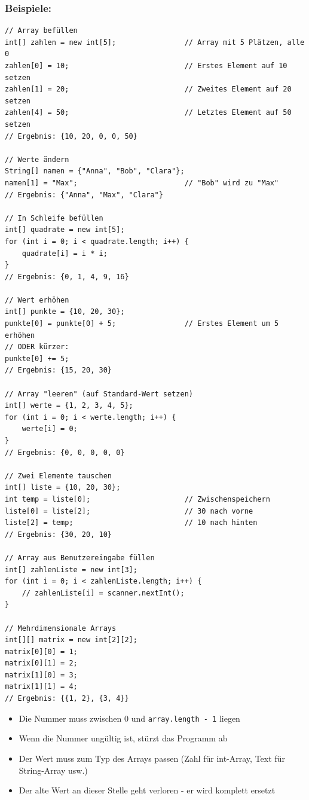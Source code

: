 \subsubsection*{Beispiele:}
\begin{lstlisting}
// Array befüllen
int[] zahlen = new int[5];                // Array mit 5 Plätzen, alle 0
zahlen[0] = 10;                           // Erstes Element auf 10 setzen
zahlen[1] = 20;                           // Zweites Element auf 20 setzen
zahlen[4] = 50;                           // Letztes Element auf 50 setzen
// Ergebnis: {10, 20, 0, 0, 50}

// Werte ändern
String[] namen = {"Anna", "Bob", "Clara"};
namen[1] = "Max";                         // "Bob" wird zu "Max"
// Ergebnis: {"Anna", "Max", "Clara"}

// In Schleife befüllen
int[] quadrate = new int[5];
for (int i = 0; i < quadrate.length; i++) {
    quadrate[i] = i * i;
}
// Ergebnis: {0, 1, 4, 9, 16}

// Wert erhöhen
int[] punkte = {10, 20, 30};
punkte[0] = punkte[0] + 5;                // Erstes Element um 5 erhöhen
// ODER kürzer:
punkte[0] += 5;
// Ergebnis: {15, 20, 30}

// Array "leeren" (auf Standard-Wert setzen)
int[] werte = {1, 2, 3, 4, 5};
for (int i = 0; i < werte.length; i++) {
    werte[i] = 0;
}
// Ergebnis: {0, 0, 0, 0, 0}

// Zwei Elemente tauschen
int[] liste = {10, 20, 30};
int temp = liste[0];                      // Zwischenspeichern
liste[0] = liste[2];                      // 30 nach vorne
liste[2] = temp;                          // 10 nach hinten
// Ergebnis: {30, 20, 10}

// Array aus Benutzereingabe füllen
int[] zahlenListe = new int[3];
for (int i = 0; i < zahlenListe.length; i++) {
    // zahlenListe[i] = scanner.nextInt();
}

// Mehrdimensionale Arrays
int[][] matrix = new int[2][2];
matrix[0][0] = 1;
matrix[0][1] = 2;
matrix[1][0] = 3;
matrix[1][1] = 4;
// Ergebnis: {{1, 2}, {3, 4}}
\end{lstlisting}

\begin{achtung}
	\begin{itemize}
		\item Die Nummer muss zwischen 0 und \texttt{array.length - 1} liegen
		\item Wenn die Nummer ungültig ist, stürzt das Programm ab
		\item Der Wert muss zum Typ des Arrays passen (Zahl für int-Array, Text für String-Array usw.)
		\item Der alte Wert an dieser Stelle geht verloren - er wird komplett ersetzt
	\end{itemize}
\end{achtung}

